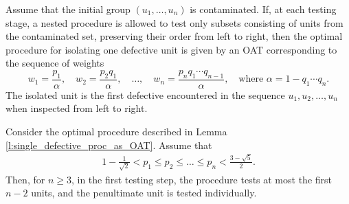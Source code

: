 \documentclass[10pt,a4paper]{amsart}
\begin{document}
\begin{lem}\label{l:single_defective_proc_as_OAT}
Assume that the initial group $(u_1, \dots, u_n)$ is contaminated. If, at each testing stage, a nested procedure is allowed to test only subsets consisting of units from the contaminated set, preserving their order from left to right, then the optimal procedure for isolating one defective unit is given by an OAT corresponding to the sequence of weights
\[
w_1 = \frac{p_1}{\alpha}, \quad w_2 = \frac{p_2 q_1}{\alpha}, \quad \dots, \quad w_n = \frac{p_n q_1 \cdots q_{n-1}}{\alpha}, \quad \text{where } \alpha = 1 - q_1 \cdots q_n.
\]
The isolated unit is the first defective encountered in the sequence $u_1, u_2, \dots, u_n$ when inspected from left to right.
\end{lem}

\begin{lem}\label{l:OAT_structure}
Consider the optimal procedure described in Lemma \ref{l:single_defective_proc_as_OAT}. Assume that
\begin{align}
\label{eq:con1}
1 - \frac{1}{\sqrt{2}} < p_1 \leq p_2 \leq \dots \leq p_n < \frac{3 - \sqrt{5}}{2}.
\end{align}
Then, for \( n \geq 3 \), in the first testing step, the procedure tests at most the first \( n - 2 \) units, and the penultimate unit is tested individually.
\end{lem}
\end{document}
